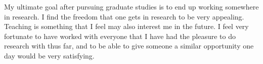 \documentclass[a4paper,12pt]{article}
\newcommand{\tab}{\hspace*{2em}}
\begin{document}
\tab My ultimate goal after pursuing graduate studies is to end up working somewhere in research.  I find the freedom that one gets in research to be very appealing.  Teaching is something that I feel may also interest me in the future.  I feel very fortunate to have worked with everyone that I have had the pleasure to do research with thus far, and to be able to give someone a similar opportunity one day would be very satisfying.
\end{document}
